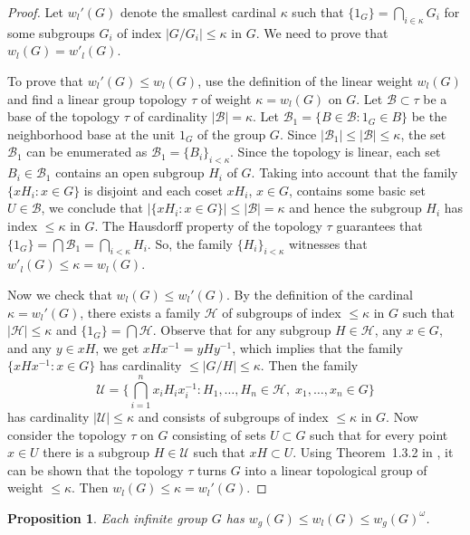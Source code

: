 \documentclass[11pt, twoside]{amsart}
\newtheorem{proposition}[theorem]{Proposition}
\theoremstyle{definition}
\begin{document}
\begin{proof}  Let $w_l'(G)$ denote the smallest cardinal $\kappa$ such that $\{1_G\}=\bigcap_{i\in\kappa}G_i$ for some subgroups $G_i$ of index $|G/G_i|\le\kappa$ in $G$. We need to prove that $w_l(G)=w'_l(G)$.

To prove that $w_l'(G)\le w_l(G)$, use the definition of the linear weight $w_l(G)$ and find a linear group topology $\tau$ of weight $\kappa=w_l(G)$ on $G$. Let $\mathcal B\subset\tau$ be a base of the topology $\tau$ of cardinality $|\mathcal B|=\kappa$. Let $\mathcal B_1=\{B\in\mathcal B:1_G\in B\}$ be the neighborhood base at the unit $1_G$ of the group $G$. Since $|\mathcal B_1|\le|\mathcal B|\le\kappa$, the set $\mathcal B_1$ can be enumerated as $\mathcal B_1=\{B_i\}_{i<\kappa}$. Since the topology is linear, each set $B_i\in\mathcal B_1$ contains an open subgroup $H_i$ of $G$. Taking into account that the family $\{xH_i:x\in G\}$ is disjoint and each coset $xH_i$, $x\in G$, contains some basic set $U\in\mathcal B$, we conclude that $|\{xH_i:x\in G\}|\le|\mathcal B|=\kappa$ and hence the subgroup $H_i$ has index $\le\kappa$ in $G$. The Hausdorff property of the topology $\tau$ guarantees that $\{1_G\}=\bigcap\mathcal B_1=\bigcap_{i<\kappa}H_i$. So, the family $\{H_i\}_{i<\kappa}$ witnesses that $w'_l(G)\le \kappa=w_l(G)$.

Now we check that $w_l(G)\le w_l'(G)$. By the definition of the cardinal $\kappa=w_l'(G)$, there exists a family $\mathcal H$ of subgroups of index $\le\kappa$ in $G$ such that $|\mathcal H|\le\kappa$ and $\{1_G\}=\bigcap\mathcal H$. Observe that for any subgroup $H\in\mathcal H$, any $x\in G$, and any $y\in xH$, we get $xHx^{-1}=yHy^{-1}$, which implies that the family $\{xHx^{-1}:x\in G\}$ has cardinality $\le|G/H|\le\kappa$. Then the family $${\mathcal U}=\big\{\bigcap_{i=1}^nx_iH_ix_i^{-1}:H_1,\dots,H_n\in{\mathcal H},\;x_1,\dots,x_n\in G\big\}$$ has cardinality $|{\mathcal U}|\le\kappa$ and consists of subgroups of index $\le\kappa$ in $G$.
Now consider the  topology $\tau$ on $G$ consisting of sets $U\subset G$ such that for every point $x\in U$ there is a subgroup $H\in{\mathcal U}$ such that $xH\subset U$. Using Theorem~1.3.2 in \cite{AT}, it can be shown that the topology $\tau$ turns $G$ into a linear topological group of weight $\le \kappa$. Then $w_l(G)\le\kappa=w_l'(G)$.
\end{proof}

\begin{proposition}\label{p:wl<wgw} Each infinite group $G$ has $w_g(G)\le w_l(G)\le w_g(G)^{\omega}$.
\end{proposition}
\end{document}
